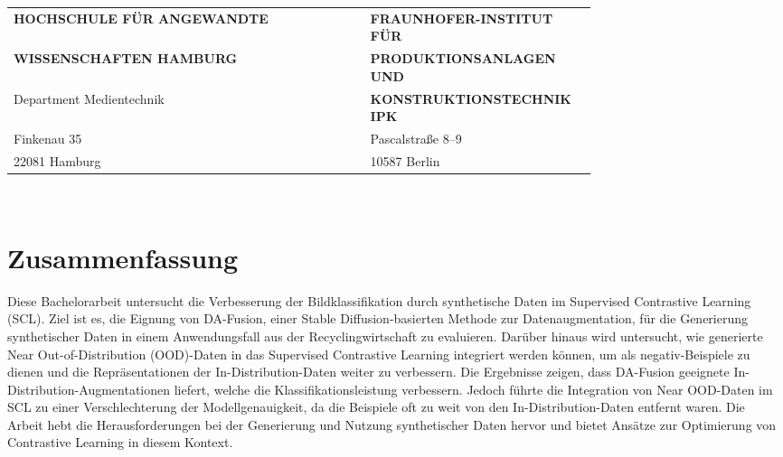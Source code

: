 \begin{titlepage}
\begin{minipage}{0.5\linewidth}
    \vspace{5mm}
	
	\begin{tabular}{@{} p{0.75\linewidth} ll} %
    \textbf{HOCHSCHULE FÜR ANGEWANDTE} & \textbf{FRAUNHOFER-INSTITUT FÜR}\\
    \textbf{WISSENSCHAFTEN HAMBURG} & \textbf{PRODUKTIONSANLAGEN UND}\\
    Department Medientechnik & \textbf{KONSTRUKTIONSTECHNIK IPK}\\
    Finkenau 35 & Pascalstraße 8–9\\
    22081 Hamburg & 10587 Berlin
	\end{tabular}\\
  \end{minipage}
\end{titlepage}
\restoregeometry

\thispagestyle{empty}

\section*{Zusammenfassung}

Diese Bachelorarbeit untersucht die Verbesserung der Bildklassifikation durch synthetische Daten im Supervised Contrastive Learning (SCL). Ziel ist es, die Eignung von DA-Fusion, einer Stable Diffusion-basierten Methode zur Datenaugmentation, für die Generierung synthetischer Daten in einem Anwendungsfall aus der Recyclingwirtschaft zu evaluieren. Darüber hinaus wird untersucht, wie generierte Near Out-of-Distribution (OOD)-Daten in das Supervised Contrastive Learning integriert werden können, um als negativ-Beispiele zu dienen und die Repräsentationen der In-Distribution-Daten weiter zu verbessern. Die Ergebnisse zeigen, dass DA-Fusion geeignete In-Distribution-Augmentationen liefert, welche die Klassifikationsleistung verbessern. Jedoch führte die Integration von Near OOD-Daten im SCL zu einer Verschlechterung der Modellgenauigkeit, da die Beispiele oft zu weit von den In-Distribution-Daten entfernt waren. Die Arbeit hebt die Herausforderungen bei der Generierung und Nutzung synthetischer Daten hervor und bietet Ansätze zur Optimierung von Contrastive Learning in diesem Kontext.

